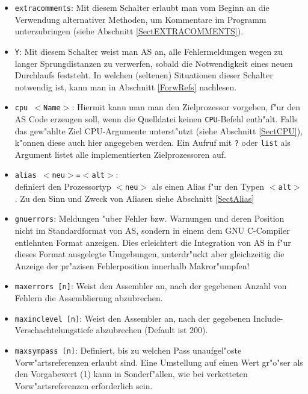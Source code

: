 \documentclass[12pt,a4paper,twoside]{report}
\newcommand{\tty}[1]{{\tt #1}}
\newcommand{\asname}{AS}
\begin{document}
\begin{itemize}
{      an die Verwendung von Maschinenbefehlen, die nur im Supervisor-Modus
      des Prozessors verwendet werden d"urfen (siehe Abschnitt \ref{SectSUPMODE}).}
\item{\tty{extracomments}: Mit diesem Schalter erlaubt man vom Beginn
      an die Verwendung alternativer Methoden, um Kommentare im Programm
      unterzubringen (siehe Abschnitt \ref{SectEXTRACOMMENTS}).}
\item{\tty{Y}: Mit diesem Schalter weist man \asname{} an, alle Fehlermeldungen
      wegen zu langer Sprungdistanzen zu verwerfen, sobald die Notwendigkeit
      eines neuen Durchlaufs feststeht.  In welchen (seltenen) Situationen
      dieser Schalter notwendig ist, kann man in Abschnitt \ref{ForwRefs}
      nachlesen.}
\item{\tty{cpu $<$Name$>$}: Hiermit kann man man den Zielprozessor
      vorgeben, f"ur den \asname{} Code erzeugen soll, wenn die Quelldatei keinen
      {\tt CPU}-Befehl enth"alt.
      Falls das gew"ahlte Ziel CPU-Argumente unterst"utzt (siehe Abschnitt
      \ref{SectCPU}), k"onnen diese auch hier angegeben werden.  Ein Aufruf
      mit \verb!?! oder {\tt list} als Argument listet alle implementierten
      Zielprozessoren auf.}
\item{\tty{alias $<$neu$>$=$<$alt$>$}:\\
      definiert den Prozessortyp \tty{$<$neu$>$} als einen Alias f"ur den
      Typen \tty{$<$alt$>$}.  Zu den Sinn und Zweck von Aliasen siehe
      Abschnitt \ref{SectAlias}}
\item{{\tt gnuerrors}: Meldungen "uber Fehler bzw. Warnungen und deren
      Position nicht im Standardformat von \asname{}, sondern in einem dem GNU
      C-Compiler entlehnten Format anzeigen.  Dies erleichtert die
      Integration von \asname{} in f"ur dieses Format ausgelegte Umgebungen,
      unterdr"uckt aber gleichzeitig die Anzeige der pr"azisen
      Fehlerposition innerhalb Makror"umpfen!}
\item{{\tt maxerrors [n]}: Weist den Assembler an, nach der gegebenen
      Anzahl von Fehlern die Assemblierung abzubrechen.}
\item{{\tt maxinclevel [n]}: Weist den Assembler an, nach der gegebenen
      Include-Verschachtelungstiefe abzubrechen (Default ist 200).}
\item{{\tt maxsympass [n]}: Definiert, bis zu welchen Pass unaufgel"oste
      Vorw"artsreferenzen erlaubt sind.  Eine Umstellung auf einen
      Wert gr"o"ser als den Vorgabewert (1) kann in Sonderf"allen, wie
      bei verketteten Vorw"artsreferenzen erforderlich sein.}

\end{itemize}
\end{document}
